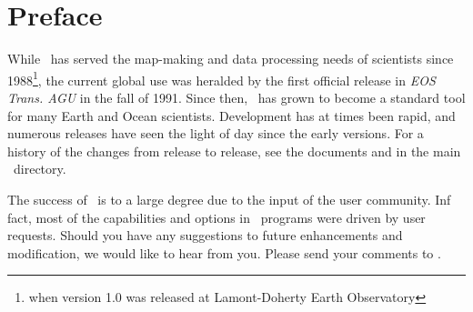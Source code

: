 %
%
\chapter{Preface} 
\thispagestyle{headings}

While \GMT\ has served the map-making and data processing needs of scientists since 1988\footnote{when
version 1.0 was released at Lamont-Doherty Earth Observatory}, the current global use was
heralded by the first official release in {\it EOS Trans. AGU} in the fall of 1991.  Since then,
\GMT\ has grown to become a standard tool for many Earth and Ocean scientists.  Development
has at times been rapid, and numerous releases have seen the light of day since the early versions.
For a history of the changes from release to release, see the documents 
and  in the main \GMT\ directory.

The success of \GMT\ is to a large degree due to the input of the user community. Inf fact, most of the
capabilities and options in \GMT\ programs were driven by user requests.
Should you have any suggestions to future enhancements and modification, we would like
to hear from you. Please send your comments to
.
